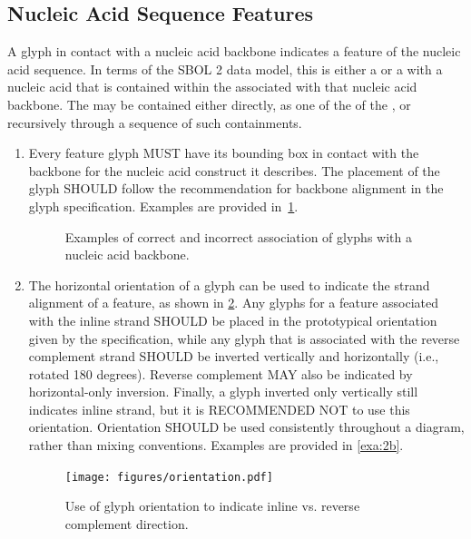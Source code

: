 \subsection{Nucleic Acid Sequence Features}
\label{s:lang:nacomponent}

A glyph in contact with a nucleic acid backbone indicates a feature of the nucleic acid sequence.
% 
In terms of the SBOL 2 data model, this is either a  or a  with a nucleic acid  that is contained within the  associated with that nucleic acid backbone.
The  may be contained either directly, as one of the  of the , or recursively through a sequence of such containments.

\begin{enumerate}
\item Every feature glyph MUST have its bounding box in contact with the backbone for the nucleic acid construct it describes. 
The placement of the glyph SHOULD follow the recommendation for backbone alignment in the glyph specification.
	Examples are provided in~\ref{exa:2a}.
   	\begin{figure}[h!]
	\centering
	\caption{Examples of correct and incorrect association of glyphs with a nucleic acid backbone.}
	\label{exa:2a}
	\end{figure}

\item The horizontal orientation of a glyph can be used to indicate the strand alignment of a feature, as shown in \ref{f:orientation}. 
	Any glyphs for a feature associated with the inline strand SHOULD be placed in the prototypical orientation given by the specification,
	while any glyph that is associated with the reverse complement strand SHOULD be inverted vertically and horizontally (i.e., rotated 180 degrees). 
	Reverse complement MAY also be indicated by horizontal-only inversion.
	Finally, a glyph inverted only vertically still indicates inline strand, but it is RECOMMENDED NOT to use this orientation.
	Orientation SHOULD be used consistently throughout a diagram, rather than mixing conventions.
	Examples are provided in \ref{exa:2b}.
	
	\begin{figure}[h!]
	\centering
	\texttt{[image: figures/orientation.pdf]}
	\caption{Use of glyph orientation to indicate inline vs. reverse complement direction.}
	\label{f:orientation}
	\end{figure} 
	

\end{enumerate}
